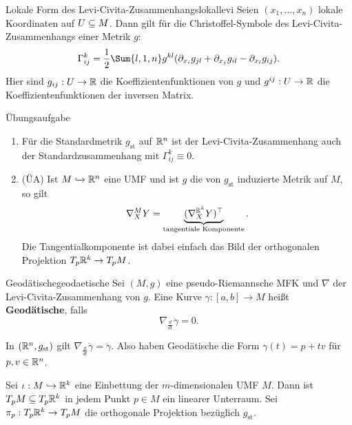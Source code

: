 \begin{satz}{Lokale Form des Levi-Civita-Zusammenhangs}{lokallevi}
Seien $(x_1, \dots, x_n)$ lokale Koordinaten auf $U \subseteq M$. Dann gilt für die Christoffel-Symbole des Levi-Civita-Zusammenhangs einer Metrik $g$:
\begin{equation}
\Gamma_{ij}^k = \frac{1}{2} \Sum{l,1,n} g^{kl} (\partial_{x_i} g_{jl} + \partial_{x_j} g_{il} - \partial_{x_l} g_{ij}).
\end{equation}
Hier sind $g_{ij}: U \to \mathbb{R}$ die Koeffizientenfunktionen von $g$ und $g^{ij}:U \to \mathbb{R}$ die Koeffizientenfunktionen der inversen Matrix.
\end{satz}
\begin{beweis}
Übungsaufgabe
\end{beweis}
\begin{beispiele}
\begin{enumerate}
\item Für die Standardmetrik $g_\text{st}$ auf $\mathbb{R}^n$ ist der Levi-Civita-Zusammenhang auch der Standardzusammenhang mit $\Gamma_{ij}^k \equiv 0$.
\item (ÜA) Ist $M \xhookrightarrow{} \mathbb{R}^n$ eine UMF und ist $g$ die von $g_\text{st}$ induzierte Metrik auf $M$, so gilt
\begin{equation}
\nabla_X^M Y = \underbrace{(\nabla_X^{\mathbb{R}^k} Y)^{\top}}_\text{tangentiale Komponente}.
\end{equation}
Die Tangentialkomponente ist dabei einfach das Bild der orthogonalen Projektion $T_p\mathbb{R}^k \to T_pM$.
\end{enumerate}
\end{beispiele}
\begin{definition}{Geodätische}{geodaetische}
Sei $(M,g)$ eine pseudo-Riemannsche MFK und $\nabla$ der Levi-Civita-Zusammenhang von $g$. Eine Kurve $\gamma: [a,b] \to M$ heißt \textbf{Geodätische}, falls
\begin{equation}
\nabla_\frac{d}{dt} \dot{\gamma} = 0.
\end{equation}
\end{definition}
\begin{beispiel}
In $(\mathbb{R}^n, g_\text{st})$ gilt $\nabla_\frac{d}{dt} \dot{\gamma} = \ddot{\gamma}$. Also haben Geodätische die Form $\gamma(t) = p + tv$ für $p, v \in \mathbb{R}^n$.
\end{beispiel}
Sei $\iota: M \hookrightarrow \mathbb{R}^k$ eine Einbettung der $m$-dimensionalen UMF $M$. Dann ist $T_pM \subseteq T_p\mathbb{R}^k$ in jedem Punkt $p \in M$ ein linearer Unterraum. Sei $\pi_p: T_p\mathbb{R}^k \to T_pM$ die orthogonale Projektion bezüglich $g_\text{st}$.
